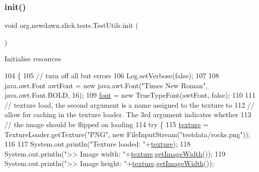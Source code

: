 \subsubsection{\texorpdfstring{init()}{init()}}
{\footnotesize\ttfamily void org.\+newdawn.\+slick.\+tests.\+Test\+Utils.\+init (\begin{DoxyParamCaption}{ }\end{DoxyParamCaption})\hspace{0.3cm}{\ttfamily [inline]}}

Initialise resources 
\begin{DoxyCode}
104                        \{
105         \textcolor{comment}{// turn off all but errors}
106         Log.setVerbose(\textcolor{keyword}{false});
107 
108         java.awt.Font awtFont = \textcolor{keyword}{new} java.awt.Font(\textcolor{stringliteral}{"Times New Roman"}, java.awt.Font.BOLD, 16);
109         \mbox{\hyperlink{classorg_1_1newdawn_1_1slick_1_1tests_1_1_test_utils_aabeb51946c510a7c4c82d367a6030b34}{font}} = \textcolor{keyword}{new} TrueTypeFont(awtFont, \textcolor{keyword}{false});
110         
111         \textcolor{comment}{// texture load, the second argument is a name assigned to the texture to}
112         \textcolor{comment}{// allow for caching in the texture loader. The 3rd argument indicates whether}
113         \textcolor{comment}{// the image should be flipped on loading}
114         \textcolor{keywordflow}{try} \{
115             \mbox{\hyperlink{classorg_1_1newdawn_1_1slick_1_1tests_1_1_test_utils_afc788f996bdde4e06aba401024783347}{texture}} = TextureLoader.getTexture(\textcolor{stringliteral}{"PNG"}, \textcolor{keyword}{new} FileInputStream(\textcolor{stringliteral}{"testdata/rocks.png"}));
116         
117             System.out.println(\textcolor{stringliteral}{"Texture loaded: "}+\mbox{\hyperlink{classorg_1_1newdawn_1_1slick_1_1tests_1_1_test_utils_afc788f996bdde4e06aba401024783347}{texture}});
118             System.out.println(\textcolor{stringliteral}{">> Image width: "}+\mbox{\hyperlink{classorg_1_1newdawn_1_1slick_1_1tests_1_1_test_utils_afc788f996bdde4e06aba401024783347}{texture}}.\mbox{\hyperlink{interfaceorg_1_1newdawn_1_1slick_1_1opengl_1_1_texture_a7dadcef354aaed97a0fe03f1978ee5f8}{getImageWidth}}());
119             System.out.println(\textcolor{stringliteral}{">> Image height: "}+\mbox{\hyperlink{classorg_1_1newdawn_1_1slick_1_1tests_1_1_test_utils_afc788f996bdde4e06aba401024783347}{texture}}.\mbox{\hyperlink{interfaceorg_1_1newdawn_1_1slick_1_1opengl_1_1_texture_a7dadcef354aaed97a0fe03f1978ee5f8}{getImageWidth}}());

\end{DoxyCode}
